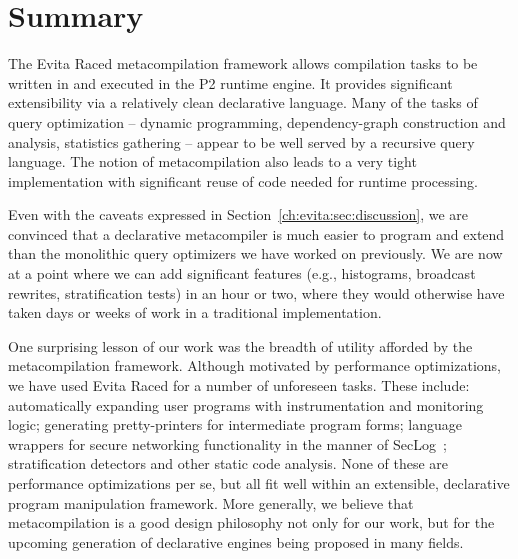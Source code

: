 \section{Summary}
\label{ch:evita:sec:summary}

The Evita Raced metacompilation framework allows \OVERLOG compilation tasks to be written in \OVERLOG and
executed in the P2 runtime engine. It provides significant extensibility via a relatively clean declarative
language. Many of the tasks of query optimization -- dynamic programming, dependency-graph construction
and analysis, statistics gathering -- appear to be well served by a recursive query language. The notion of
metacompilation also leads to a very tight implementation with significant reuse of code needed for
runtime processing.

Even with the caveats expressed in Section~\ref{ch:evita:sec:discussion}, we are convinced that a declarative metacompiler
is much easier to program and extend than the monolithic query optimizers we have worked on previously.
We are now at a  point where we can add significant features (e.g., histograms, broadcast rewrites, 
stratification tests) in an hour or two, where they would otherwise have taken days or weeks of work
in a traditional implementation. 

One surprising lesson of our work was the breadth of utility afforded by the metacompilation framework. Although
motivated by performance optimizations, we have used Evita Raced for a number of unforeseen tasks. These
include: automatically expanding user programs with instrumentation and monitoring logic; generating pretty-printers
for intermediate program forms; language wrappers for secure networking functionality in the manner of
SecLog~\cite{abadi-netdb07}; stratification detectors and other static code analysis. None of these are performance optimizations
per se, but all fit well within an extensible, declarative program manipulation framework. More generally, we believe
that metacompilation is a good design philosophy not only for our work, but for the upcoming generation of
declarative engines being proposed in many fields. 

